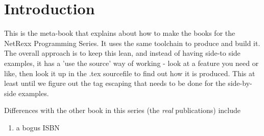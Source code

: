 \chapter{Introduction}
This is the meta-book that explains about how to make the books for
the NetRexx Programming Series. It uses the same toolchain to
produce and build it. The overall approach is to keep this lean, and
instead of having side-to side examples, it has a 'use the source' way
of working - look at a feature you need or like, then look it up in
the .tex sourcefile to find out how it is produced. This at least
until we figure out the tag escaping that needs to be done for the
side-by-side examples.

Differences with the other book in this series (the \emph{real}
publications) include
\begin{enumerate}
\item a bogus ISBN
\end{enumerate}